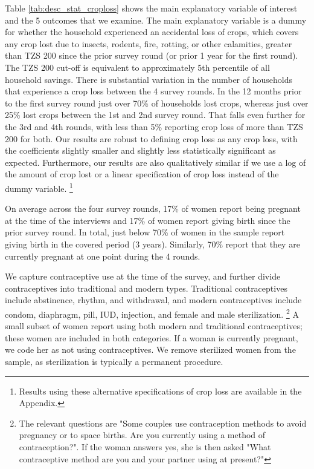 \documentclass[letterpaper,12pt]{article}
\begin{document}
Table \ref{tab:desc_stat_croploss} shows the main explanatory variable of interest 
and the 5 outcomes that we examine.
The main explanatory variable is a dummy for whether the household experienced 
an accidental loss of crops, which covers any crop lost due to insects, 
rodents, fire, rotting, or other calamities, greater than TZS 200 since the 
prior survey round (or prior 1 year for the first round).
The TZS 200 cut-off is equivalent to approximately 5th 
percentile of all household savings.%
There is substantial variation in the number of households that experience a 
crop loss between the 4 survey rounds.
In the 12 months prior to the first survey round just over 70\% of households 
lost crops, whereas just over 25\% lost crops between the 1st and 2nd survey round.
That falls even further for the 3rd and 4th rounds, with less than 5\% 
reporting crop loss of more than TZS 200 for both.
Our results are robust to defining crop loss as any crop loss, with the 
coefficients slightly smaller and slightly less statistically 
significant as expected. 
Furthermore, our results are also qualitatively similar if we use a log of the amount of 
crop lost or a linear specification of crop loss instead of the dummy variable.
\footnote{
Results using these alternative specifications of crop loss are available in the Appendix.
}

On average across the four survey rounds, 17\% of women report being pregnant 
at the time of the interviews and 17\% of women report giving birth since the 
prior survey round.
In total, just below 70\% of women in the sample report giving birth in
the covered period (3 years).
Similarly, 70\% report that they are currently pregnant at one point during 
the 4 rounds.

We capture contraceptive use at the time of the survey, and further divide
contraceptives into traditional and modern types. 
Traditional contraceptives include abstinence, rhythm, and withdrawal, 
and modern contraceptives include condom, diaphragm, pill, IUD, injection,
and female and male sterilization.%
\footnote{
The relevant questions are "Some couples use contraception methods to avoid
pregnancy or to space births. Are you currently using a method of contraception?".
If the woman answers yes, she is then asked "What contraceptive method are you
and your partner using at present?"
}
A small subset of women report using both modern and traditional contraceptives;
these women are included in both categories.
If a woman is currently pregnant, we code her as not using contraceptives.
We remove sterilized women from the sample, as sterilization is typically a 
permanent procedure.
\end{document}
